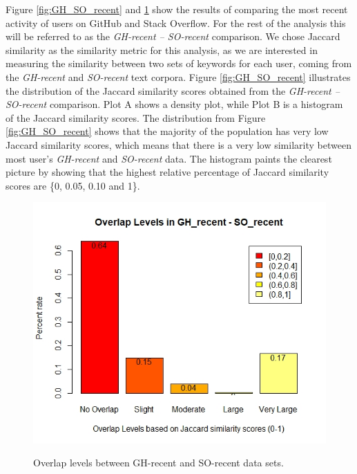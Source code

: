         Figure \ref{fig:GH_SO_recent} and \ref{fig:overlap_GH_SO_recent} show the results of comparing the most recent activity of users on GitHub and Stack Overflow. For the rest of the analysis this will be referred to as the \emph{GH-recent -- SO-recent} comparison. We chose Jaccard similarity as the similarity metric for this analysis, as we are interested in measuring the similarity between two sets of keywords for each user, coming from the \emph{GH-recent} and \emph{SO-recent} text corpora. Figure \ref{fig:GH_SO_recent} illustrates the distribution of the Jaccard similarity scores obtained from the \emph{GH-recent -- SO-recent} comparison. Plot A shows a density plot, while Plot B is a  histogram of the Jaccard similarity scores. The distribution from Figure \ref{fig:GH_SO_recent} shows that the majority of the population has very low Jaccard similarity scores, which means that there is a very low similarity between most user's \emph{GH-recent} and \emph{SO-recent} data. The histogram paints the clearest picture by showing that the highest relative percentage of Jaccard similarity scores are \{0, 0.05, 0.10 and 1\}.
        
        \begin{figure}
          \centering
          \includegraphics[width=\textwidth]{figures/overlap_GH_SO_recent.jpeg}\\
          \caption{Overlap levels between GH-recent and SO-recent data sets.}
          \label{fig:overlap_GH_SO_recent}
        \end{figure}
        
